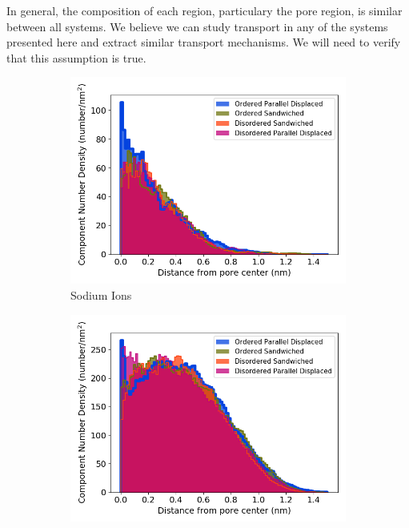\documentclass[journal=jpcbfk,manusciprt=article]{achemso}
\begin{document}
  In general, the composition of each region, particulary the pore region, is 
  similar between all systems. We believe we can study transport in any of the
  systems presented here and extract similar transport mechanisms. We will need
  to verify that this assumption is true. 
  
  \begin{figure}
  \centering
  \begin{subfigure}{0.5\textwidth}
        \includegraphics[width=1\linewidth]{sodium_density.png}
        \caption{Sodium Ions}
        \label{fig:sodium_regional_density}
  \end{subfigure}
  \begin{subfigure}{0.5\textwidth}
        \includegraphics[width=1\linewidth]{head_group_density.png}

\end{subfigure}
\end{figure}
\end{document}
